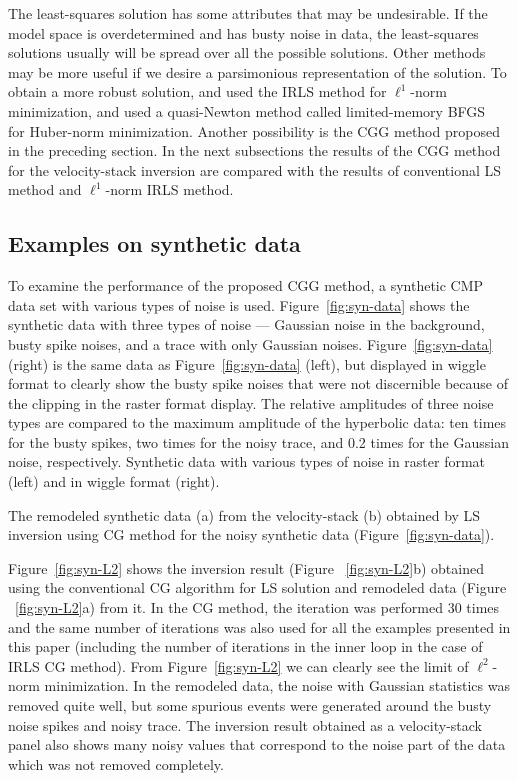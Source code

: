 The least-squares solution has some attributes that may be undesirable. 
If the model space is overdetermined and has busty noise in data,
the least-squares solutions usually will be spread over all the possible solutions. 
Other methods may be more useful 
if we desire a parsimonious representation of the solution. 
To obtain a more robust solution,
\cite{Nichols.sep.82.1} and \cite{GEO68-01-03860399} 
used the IRLS method for $\ell^1$-norm minimization,
and \cite{GEO68-04-13101319} used 
a quasi-Newton method called limited-memory BFGS 
~\cite{Broyden-16-670,Fletcher-13-03170322,Goldfarb-24-023026,Shanno-24-06470657,Nocedal-95-03390353} 
for Huber-norm minimization.
Another possibility is the CGG method proposed in the preceding section.
In the next subsections the results of the CGG method 
for the velocity-stack inversion are 
compared with the results of conventional 
LS method and $\ell^1$-norm IRLS method.


\subsection{Examples on synthetic data}
To examine the performance of the proposed CGG method,
a synthetic CMP data set with various types of noise is used.
Figure~\ref{fig:syn-data} shows the synthetic data
with three types of noise 
--- Gaussian noise in the background, busty spike noises, 
and a trace with only Gaussian noises.
Figure~\ref{fig:syn-data} (right) is the same data as Figure~\ref{fig:syn-data} (left), 
but displayed in wiggle format to clearly show the busty spike noises
that were not discernible because of the clipping in the raster format display.
The relative amplitudes of three noise types are compared to the maximum amplitude of the hyperbolic data:
ten times for the busty spikes, two times for the noisy trace, 
and 0.2 times for the Gaussian noise, respectively.
{Synthetic data with various types of noise in raster format (left) and in wiggle format (right).}

{The remodeled synthetic data (a) from the velocity-stack (b) obtained by LS inversion 
using CG method for the noisy synthetic data (Figure~\ref{fig:syn-data}).}

Figure~\ref{fig:syn-L2} shows 
the inversion result (Figure ~\ref{fig:syn-L2}b) obtained using the conventional 
CG algorithm for LS solution and remodeled data (Figure ~\ref{fig:syn-L2}a) from it. 
In the CG method, the iteration was performed 30 times 
and the same number of iterations was also used for all the examples presented in this paper
(including the number of iterations in the inner loop in the case of IRLS CG method).
From Figure~\ref{fig:syn-L2} we can clearly see the limit of $\ell^2$-norm minimization.
In the remodeled data, the noise with Gaussian statistics was removed quite well,
but some spurious events were generated around the busty noise spikes and noisy trace.
The inversion result obtained as a velocity-stack panel 
also shows many noisy values that correspond to
the noise part of the data which was not removed completely.

